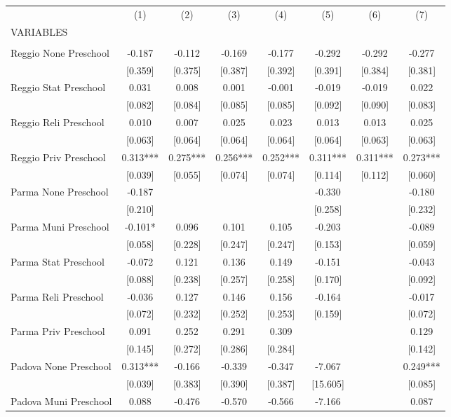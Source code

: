 \begin{tabular}{lccccccc} \hline
 & (1) & (2) & (3) & (4) & (5) & (6) & (7) \\
VARIABLES &  &  &  &  &  &  &  \\ \hline
 &  &  &  &  &  &  &  \\
Reggio None Preschool & -0.187 & -0.112 & -0.169 & -0.177 & -0.292 & -0.292 & -0.277 \\
 & [0.359] & [0.375] & [0.387] & [0.392] & [0.391] & [0.384] & [0.381] \\
Reggio Stat Preschool & 0.031 & 0.008 & 0.001 & -0.001 & -0.019 & -0.019 & 0.022 \\
 & [0.082] & [0.084] & [0.085] & [0.085] & [0.092] & [0.090] & [0.083] \\
Reggio Reli Preschool & 0.010 & 0.007 & 0.025 & 0.023 & 0.013 & 0.013 & 0.025 \\
 & [0.063] & [0.064] & [0.064] & [0.064] & [0.064] & [0.063] & [0.063] \\
Reggio Priv Preschool & 0.313*** & 0.275*** & 0.256*** & 0.252*** & 0.311*** & 0.311*** & 0.273*** \\
 & [0.039] & [0.055] & [0.074] & [0.074] & [0.114] & [0.112] & [0.060] \\
Parma None Preschool & -0.187 &  &  &  & -0.330 &  & -0.180 \\
 & [0.210] &  &  &  & [0.258] &  & [0.232] \\
Parma Muni Preschool & -0.101* & 0.096 & 0.101 & 0.105 & -0.203 &  & -0.089 \\
 & [0.058] & [0.228] & [0.247] & [0.247] & [0.153] &  & [0.059] \\
Parma Stat Preschool & -0.072 & 0.121 & 0.136 & 0.149 & -0.151 &  & -0.043 \\
 & [0.088] & [0.238] & [0.257] & [0.258] & [0.170] &  & [0.092] \\
Parma Reli Preschool & -0.036 & 0.127 & 0.146 & 0.156 & -0.164 &  & -0.017 \\
 & [0.072] & [0.232] & [0.252] & [0.253] & [0.159] &  & [0.072] \\
Parma Priv Preschool & 0.091 & 0.252 & 0.291 & 0.309 &  &  & 0.129 \\
 & [0.145] & [0.272] & [0.286] & [0.284] &  &  & [0.142] \\
Padova None Preschool & 0.313*** & -0.166 & -0.339 & -0.347 & -7.067 &  & 0.249*** \\
 & [0.039] & [0.383] & [0.390] & [0.387] & [15.605] &  & [0.085] \\
Padova Muni Preschool & 0.088 & -0.476 & -0.570 & -0.566 & -7.166 &  & 0.087 \\

\end{tabular}

